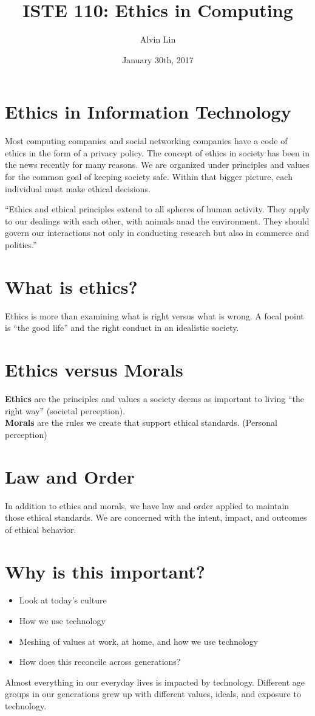 \documentclass[letterpaper, 12pt]{article}
\title{ISTE 110: Ethics in Computing}
\author{Alvin Lin}
\date{January 30th, 2017}
\begin{document}
\maketitle

\section*{Ethics in Information Technology}
Most computing companies and social networking companies have a code of ethics
in the form of a privacy policy. The concept of ethics in society has been
in the news recently for many reasons. We are organized under principles and
values for the common goal of keeping society safe. Within that bigger picture,
each individual must make ethical decisions. \par
``Ethics and ethical principles extend to all spheres of human activity. They
apply to our dealings with each other, with animals anad the environment. They
should govern our interactions not only in conducting research but also in
commerce and politics.''

\section*{What is ethics?}
Ethics is more than examining what is right versus what is wrong. A focal point
is ``the good life'' and the right conduct in an idealistic society.

\section*{Ethics versus Morals}
\textbf{Ethics} are the principles and values a society deems as important to
living ``the right way'' (societal perception). \\
\textbf{Morals} are the rules we create that support ethical standards.
(Personal perception)

\section*{Law and Order}
In addition to ethics and morals, we have law and order applied to maintain
those ethical standards. We are concerned with the intent, impact, and outcomes
of ethical behavior.

\section*{Why is this important?}
\begin{itemize}
  \item Look at today's culture
  \item How we use technology
  \item Meshing of values at work, at home, and how we use technology
  \item How does this reconcile across generations?
\end{itemize}
Almost everything in our everyday lives is impacted by technology. Different
age groups in our generations grew up with different values, ideals, and
exposure to technology.
\end{document}
